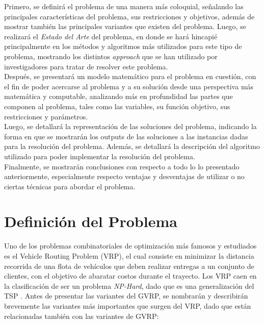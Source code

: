 \documentclass[letter, 10pt]{article}
\begin{document}
Primero, se definirá el problema de una manera más coloquial, señalando las principales características del problema, sus restricciones y objetivos, además de mostrar también las principales variantes que existen del problema. Luego, se realizará el \emph{Estado del Arte} del problema, en donde se hará hincapié principalmente en los métodos y algoritmos más utilizados para este tipo de problema, mostrando los distintos \emph{approach} que se han utilizado por investigadores para tratar de resolver este problema.
\\

Después, se presentará un modelo matemático para el problema en cuestión, con el fin de poder acercarse al problema y a su solución desde una perspectiva más matemática y computable, analizando más en profundidad las partes que componen al problema, tales como las variables, su función objetivo, sus restricciones y parámetros.
\\

Luego, se detallará la representación de las soluciones del problema, indicando la forma en que se mostrarán los outputs de las soluciones a las instancias dadas para la resolución del problema. Además, se detallará la descripción del algoritmo utilizado para poder implementar la resolución del problema.
\\

Finalmente, se mostrarán conclusiones con respecto a todo lo lo presentado anteriormente, especialmente respecto ventajas y desventajas de utilizar o no ciertas técnicas para abordar el problema.


\section{Definici\'on del Problema}
\label{definicion}
Uno de los problemas combinatoriales de optimización más famosos y estudiados es el Vehicle Routing Problem (VRP), el cual consiste en minimizar la distancia recorrida de una flota de vehículos que deben realizar entregas a un conjunto de clientes, con el objetivo de abaratar costos durante el trayecto. Los VRP caen en la clasificación de ser un problema \emph{NP-Hard}, dado que es una generalización del TSP \cite{RePEc:inm:ormnsc:v:6:y:1959:i:1:p:80-91}. Antes de presentar las variantes del GVRP, se nombrarán y describirán brevemente las variantes más importantes que surgen del VRP, dado que están relacionadas también con las variantes de GVRP:
\\
\end{document}
